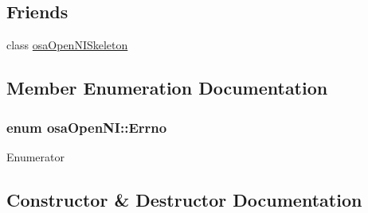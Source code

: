 \subsection*{Friends}
\begin{DoxyCompactItemize}
\item 
class \hyperlink{classosa_open_n_i_a7c2cdffe82d515f12a725b676dd0080b}{osa\+Open\+N\+I\+Skeleton}
\end{DoxyCompactItemize}


\subsection{Member Enumeration Documentation}
\hypertarget{classosa_open_n_i_a9f02bd17e25b1ee362b08c5620e307db}{}
\subsubsection[{Errno}]{\setlength{\rightskip}{0pt plus 5cm}enum {\bf osa\+Open\+N\+I\+::\+Errno}}\label{classosa_open_n_i_a9f02bd17e25b1ee362b08c5620e307db}
\begin{Desc}
\item[Enumerator]\par
\begin{description}
\item[{\em 
\hypertarget{classosa_open_n_i_a9f02bd17e25b1ee362b08c5620e307dba78d51d697ce0176897623cb3094bb2b2}{}E\+S\+U\+C\+C\+E\+S\+S\label{classosa_open_n_i_a9f02bd17e25b1ee362b08c5620e307dba78d51d697ce0176897623cb3094bb2b2}
}]\item[{\em 
\hypertarget{classosa_open_n_i_a9f02bd17e25b1ee362b08c5620e307dba4eb89ca8c5addf282144176f9d013b57}{}E\+F\+A\+I\+L\+U\+R\+E\label{classosa_open_n_i_a9f02bd17e25b1ee362b08c5620e307dba4eb89ca8c5addf282144176f9d013b57}
}]\end{description}
\end{Desc}


\subsection{Constructor \& Destructor Documentation}
\hypertarget{classosa_open_n_i_aa84fdbe2c499a1a00ae275052f8bd9f7}{}
